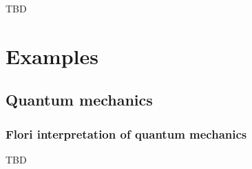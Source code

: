 TBD

\section{Examples}

\subsection{Quantum mechanics}

\subsubsection{Flori interpretation of quantum mechanics}
TBD
